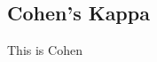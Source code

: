 \subsection{Cohen's Kappa}
\label{chp:fundamentals:sec:inter_rater_agreement:subsec:cohens_kappa}
This is Cohen
